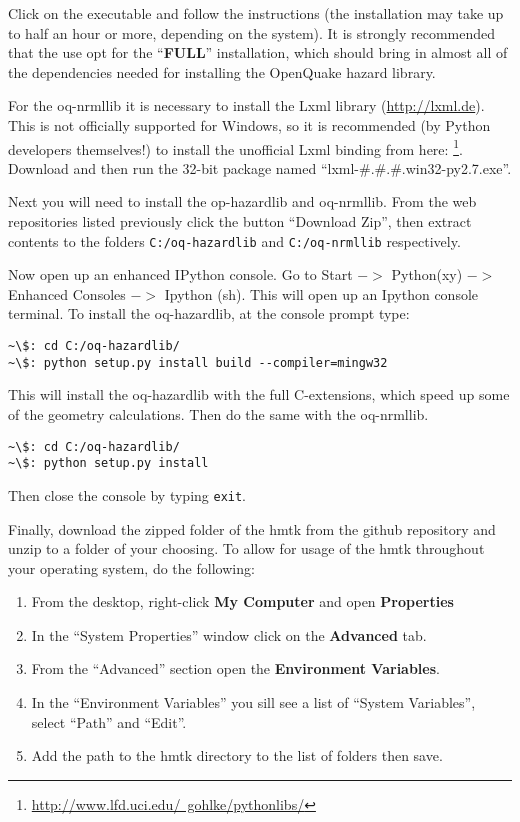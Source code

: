 Click on the executable and follow the instructions (the installation may take up to half an hour or more, depending on the system). It is strongly recommended that the use opt for the ``\textbf{FULL}'' installation, which should bring in almost all of the dependencies needed for installing the OpenQuake hazard library. 

For the oq-nrmllib it is necessary to install the Lxml library (\href{http://lxml.de}{http://lxml.de}). This is not officially supported for Windows, so it is recommended (by Python developers themselves!) to install the unofficial Lxml binding from here: \footnote{\href{http://www.lfd.uci.edu/~gohlke/pythonlibs/}{http://www.lfd.uci.edu/~gohlke/pythonlibs/}}. Download and then run the 32-bit package named ``lxml-\#.\#.\#.win32-py2.7.exe''.

Next you will need to install the op-hazardlib and oq-nrmllib. From the web repositories listed previously click the button ``Download Zip'', then extract contents to the folders \verb=C:/oq-hazardlib= and \verb=C:/oq-nrmllib= respectively.

Now open up an enhanced IPython console. Go to Start $->$ Python(xy) $->$ Enhanced Consoles $->$ Ipython (sh). This will open up an Ipython console terminal. To install the oq-hazardlib, at the console prompt type:

\begin{Verbatim}[frame=single, commandchars=\\\{\}, fontsize=\scriptsize]
~\$: cd C:/oq-hazardlib/
~\$: python setup.py install build --compiler=mingw32
\end{Verbatim}

This will install the oq-hazardlib with the full C-extensions, which speed up some of the geometry calculations. Then do the same with the oq-nrmllib.

\begin{Verbatim}[frame=single, commandchars=\\\{\}, fontsize=\scriptsize]
~\$: cd C:/oq-hazardlib/
~\$: python setup.py install
\end{Verbatim}

Then close the console by typing \verb=exit=. 

Finally, download the zipped folder of the hmtk from the github repository and unzip to a folder of your choosing. To allow for usage of the hmtk throughout your operating system, do the following: 

\begin{enumerate}
\item From the desktop, right-click \textbf{My Computer} and open \textbf{Properties}
\item In the ``System Properties'' window click on the \textbf{Advanced} tab.
\item From the ``Advanced'' section open the \textbf{Environment Variables}.
\item In the ``Environment Variables'' you sill see a list of ``System Variables'', select ``Path'' and ``Edit''.
\item Add the path to the hmtk directory to the list of folders then save.
\end{enumerate}

